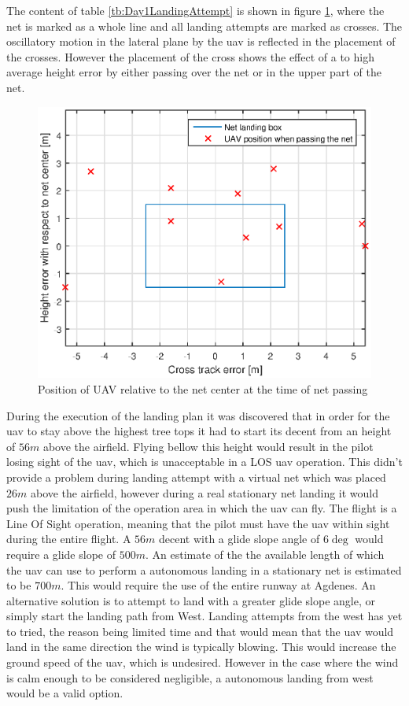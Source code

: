 The content of table \ref{tb:Day1LandingAttempt} is shown in figure \ref{Fig:Day1NetPass}, where the net is marked as a whole line and all landing attempts are marked as crosses. The oscillatory motion in the lateral plane by the \gls{uav} is reflected in the placement of the crosses. However the placement of the cross shows the effect of a to high average height error by either passing over the net or in the upper part of the net.
\begin{figure}[H]
\centering
\includegraphics[scale=0.7]{figs/Experiment/day1NetHit.eps}
\caption{Position of UAV relative to the net center at the time of net passing}
\label{Fig:Day1NetPass}
\end{figure}
During the execution of the landing plan it was discovered that in order for the \gls{uav} to stay above the highest tree tops it had to start its decent from an height of $56 m$ above the airfield. Flying bellow this height would result in the pilot losing sight of the \gls{uav}, which is unacceptable in a LOS \gls{uav} operation. This didn't provide a problem during landing attempt with a virtual net which was placed $26 m$ above the airfield, however during a real stationary net landing it would push the limitation of the operation area in which the \gls{uav} can fly. The flight is a Line Of Sight operation, meaning that the pilot must have the \gls{uav} within sight during the entire flight. A $56 m $ decent with a glide slope angle of $6\deg$ would require a glide slope of $500 m$. An estimate of the the available length of which the \gls{uav} can use to perform a autonomous landing in a stationary net is estimated to be $700 m$. This would require the use of the entire runway at Agdenes. An alternative solution is to attempt to land with a greater glide slope angle, or simply start the landing path from West. Landing attempts from the west has yet to tried, the reason being limited time and that would mean that the \gls{uav} would land in the same direction the wind is typically blowing. This would increase the ground speed of the \gls{uav}, which is undesired. However in the case where the wind is calm enough to be considered negligible, a autonomous landing from west would be a valid option.
